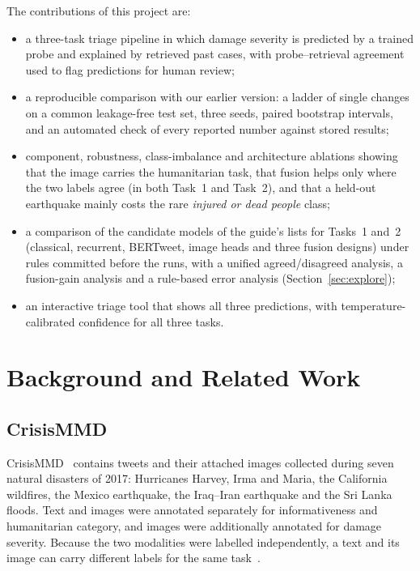 \documentclass[conference]{IEEEtran}
\begin{document}
The contributions of this project are:
\begin{itemize}
\item a three-task triage pipeline in which damage severity is predicted by a trained probe and explained by retrieved past cases, with probe--retrieval agreement used to flag predictions for human review;
\item a reproducible comparison with our earlier version: a ladder of single changes on a common leakage-free test set, three seeds, paired bootstrap intervals, and an automated check of every reported number against stored results;
\item component, robustness, class-imbalance and architecture ablations showing that the image carries the humanitarian task, that fusion helps only where the two labels agree (in both Task~1 and Task~2), and that a held-out earthquake mainly costs the rare \emph{injured or dead people} class;
\item a comparison of the candidate models of the guide's lists for Tasks~1 and~2 (classical, recurrent, BERTweet, image heads and three fusion designs) under rules committed before the runs, with a unified agreed/disagreed analysis, a fusion-gain analysis and a rule-based error analysis (Section~\ref{sec:explore});
\item an interactive triage tool that shows all three predictions, with temperature-calibrated confidence for all three tasks.
\end{itemize}

\section{Background and Related Work}

\subsection{CrisisMMD}
CrisisMMD~\cite{alam2018} contains tweets and their attached images collected during seven natural disasters of 2017: Hurricanes Harvey, Irma and Maria, the California wildfires, the Mexico earthquake, the Iraq--Iran earthquake and the Sri Lanka floods. Text and images were annotated separately for informativeness and humanitarian category, and images were additionally annotated for damage severity. Because the two modalities were labelled independently, a text and its image can carry different labels for the same task~\cite{ofli2020}.
\end{document}
